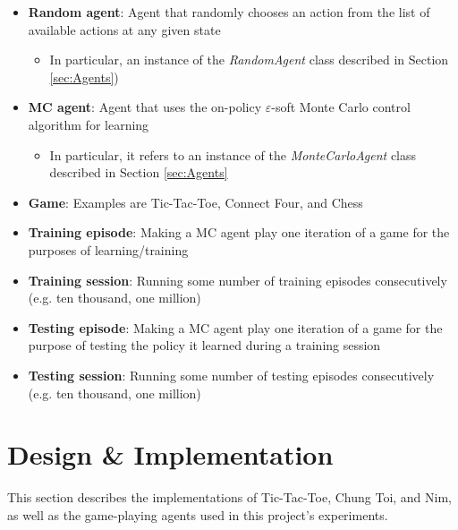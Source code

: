 \documentclass[11pt,a4paper]{report}
\begin{document}
\begin{itemize}

	\item \textbf{Random agent}: Agent that randomly chooses an action from the list of available actions at any given state
		\begin{itemize}
			\item In particular, an instance of the \emph{RandomAgent} class described in Section \ref{sec:Agents})
		\end{itemize}

	\item \textbf{MC agent}: Agent that uses the on-policy $\varepsilon$-soft Monte Carlo control algorithm for learning
		\begin{itemize}
			\item In particular, it refers to an instance of the \emph{MonteCarloAgent} class described in Section \ref{sec:Agents}
		\end{itemize}

	\item \textbf{Game}: Examples are Tic-Tac-Toe, Connect Four, and Chess

	\item \textbf{Training episode}: Making a MC agent play one iteration of a game for the purposes of learning/training

	\item \textbf{Training session}: Running some number of training episodes consecutively (e.g. ten thousand, one million)

	\item \textbf{Testing episode}: Making a MC agent play one iteration of a game for the purpose of testing the policy it learned during a training session

	\item \textbf{Testing session}: Running some number of testing episodes consecutively (e.g. ten thousand, one million)

\end{itemize}


\chapter{Design \& Implementation}
\label{sec:DesignImpl}

This section describes the implementations of Tic-Tac-Toe, Chung Toi, and Nim, as well as the game-playing agents used in this project's experiments.
\end{document}
